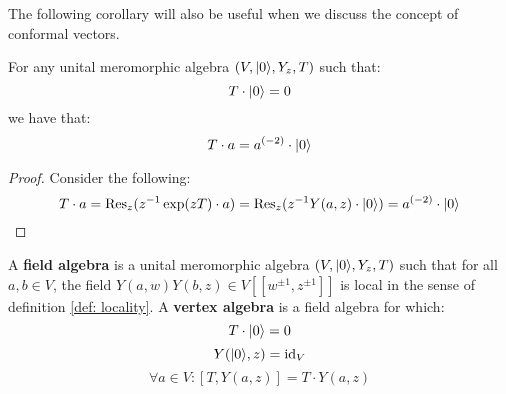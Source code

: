        The following corollary will also be useful when we discuss the concept of conformal vectors.
        \begin{corollary} \label{coro: translation_operator_formula}
            For any unital meromorphic algebra $(V, \lvert {0} \rangle, Y_z, T)$ such that:
                $$T \cdot \lvert {0} \rangle = 0$$
            we have that:
                $$T \cdot a = a^{(-2)} \cdot \lvert {0} \rangle$$
        \end{corollary}
            \begin{proof}
                Consider the following:
                    $$T \cdot a = \mathrm{Res}_z ( z^{-1} \exp(zT) \cdot a)  = \mathrm{Res}_z ( z^{-1} Y(a, z) \cdot \lvert {0} \rangle ) = a^{(-2)} \cdot \lvert {0} \rangle$$
            \end{proof}

        \begin{definition} \label{def: field_algebras_and_vertex_algebras}
            A \textbf{field algebra} is a unital meromorphic algebra $(V, \lvert {0} \rangle, Y_z, T)$ such that for all $a, b \in V$, the field $Y(a, w) Y(b, z) \in V[\![w^{\pm 1}, z^{\pm 1}]\!]$ is local in the sense of definition \ref{def: locality}. A \textbf{vertex algebra} is a field algebra for which:
                $$T \cdot \lvert {0} \rangle = 0$$
                $$Y(\lvert {0} \rangle, z) = \mathrm{id}_V$$
                $$\forall a \in V: [ T, Y(a, z) ] = T \cdot Y(a, z)$$
        \end{definition}

